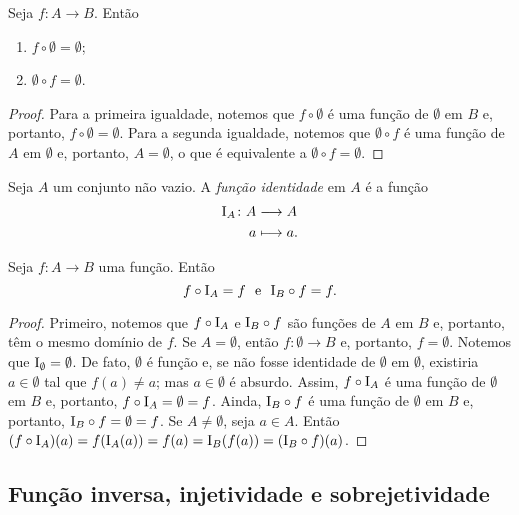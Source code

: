\begin{proposition}
	Seja $f\colon A \to B$. Então
	\begin{enumerate}
	\item $f \circ \emptyset = \emptyset$;
	\item $\emptyset \circ f = \emptyset$.
	\end{enumerate}
\end{proposition}
\begin{proof}
	Para a primeira igualdade, notemos que $f \circ \emptyset$ é uma função de $\emptyset$ em $B$ e, portanto, $f \circ \emptyset=\emptyset$. Para a segunda igualdade, notemos que $\emptyset \circ f$ é uma função de $A$ em $\emptyset$ e, portanto, $A=\emptyset$, o que é equivalente a $\emptyset \circ f=\emptyset$.
\end{proof}

\begin{definition}
	Seja $A$ um conjunto não vazio. A \emph{função identidade} em $A$ é a função
	\begin{align*}
	{\mathrm{I}_A}\colon {A} &\longrightarrow {A} \\{a} &\longmapsto a.
	\end{align*}
\end{definition}

\begin{proposition}
\label{prop:id.comp.func}
	Seja $f\colon A \to B$ uma função. Então
	\begin{equation*}
	f \circ \Id_A = f \text{\ \ e\ \ } \Id_B \circ f = f.
	\end{equation*}
\end{proposition}
\begin{proof}
	Primeiro, notemos que $f \circ \mathrm{I}_A$ e $\mathrm{I}_B \circ f$ são funções de $A$ em $B$ e, portanto, têm o mesmo domínio de $f$. Se $A = \emptyset$, então $f: \emptyset \to B$ e, portanto, $f=\emptyset$. Notemos que $\mathrm{I}_\emptyset = \emptyset$. De fato, $\emptyset$ é função e, se não fosse identidade de $\emptyset$ em $\emptyset$, existiria $a \in \emptyset$ tal que $f(a) \neq a$; mas $a \in \emptyset$ é absurdo. Assim, $f \circ \mathrm{I}_A$ é uma função de $\emptyset$ em $B$ e, portanto, $f \circ \mathrm{I}_A = \emptyset = f$. Ainda, $\mathrm{I}_B \circ f$ é uma função de $\emptyset$ em $B$ e, portanto, $\mathrm{I}_B \circ f = \emptyset = f$. Se $A \neq \emptyset$, seja $a \in A$. Então $(f \circ \mathrm{I}_A) (a) = f(\mathrm{I}_A(a)) = f(a) = \mathrm{I}_B(f(a)) = (\mathrm{I}_B \circ f)(a)$.
\end{proof}

\subsection{Função inversa, injetividade e sobrejetividade}

